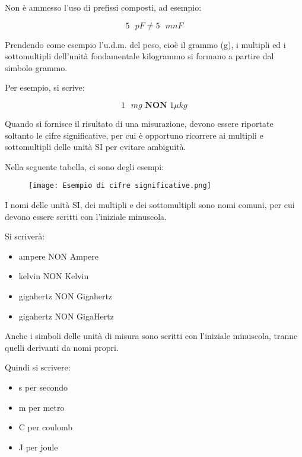 Non è ammesso l'uso di prefissi composti, ad esempio: 

{
    \Large 
    \begin{equation}
        5 \text{ } pF \neq 5 \text{ } mnF
    \end{equation}
}

Prendendo come esempio l'u.d.m. del peso, cioè il grammo (g), 
i multipli ed i sottomultipli dell'unità fondamentale kilogrammo si formano a partire dal simbolo grammo. \newline 

Per esempio, si scrive: 

{
    \Large 
    \begin{equation}
        1 \text{ } mg \textbf{ NON } 1 \mu kg
    \end{equation}
}

Quando si fornisce il risultato di una misurazione, 
devono essere riportate soltanto le cifre significative, 
per cui è opportuno ricorrere ai multipli e sottomultipli delle unità SI per evitare ambiguità. \newline 

Nella seguente tabella, ci sono degli esempi: 

\begin{figure}[h]
    \centering
    \texttt{[image: Esempio di cifre significative.png]}
\end{figure}

I nomi delle unità SI, dei multipli e dei sottomultipli sono nomi comuni, 
per cui devono essere scritti con l'iniziale minuscola. \newline 

Si scriverà: 

\begin{itemize}
    \item ampere NON Ampere 
    \item kelvin NON Kelvin 
    \item gigahertz NON Gigahertz 
    \item gigahertz NON GigaHertz
\end{itemize}

Anche i simboli delle unità di misura sono scritti con l'iniziale minuscola, 
tranne quelli derivanti da nomi propri. \newline 

Quindi si scrivere: 

\begin{itemize}
    \item s per secondo 
    \item m per metro 
    \item C per coulomb 
    \item J per joule 
\end{itemize}

